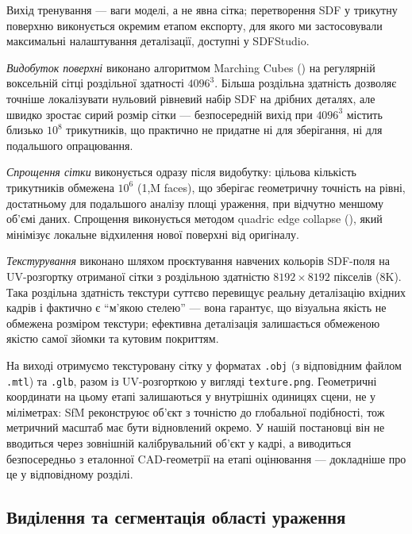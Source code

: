 \documentclass[
  ukrainian,
  10pt,
  a4paper,
  twocolumn]{article}
\begin{document}
Вихід тренування --- ваги моделі, а не явна сітка; перетворення SDF у
трикутну поверхню виконується окремим етапом експорту, для якого ми
застосовували максимальні налаштування деталізації, доступні у
SDFStudio.

\emph{Видобуток поверхні} виконано алгоритмом Marching Cubes
() на
регулярній воксельній сітці роздільної здатності \(4096^3\). Більша
роздільна здатність дозволяє точніше локалізувати нульовий рівневий
набір SDF на дрібних деталях, але швидко зростає сирий розмір сітки ---
безпосередній вихід при \(4096^3\) містить близько \(10^8\) трикутників,
що практично не придатне ні для зберігання, ні для подальшого
опрацювання.

\emph{Спрощення сітки} виконується одразу після видобутку: цільова
кількість трикутників обмежена \(10^6\) (1,M faces), що зберігає
геометричну точність на рівні, достатньому для подальшого аналізу площі
ураження, при відчутно меншому об'ємі даних. Спрощення виконується
методом quadric edge collapse
(),
який мінімізує локальне відхилення нової поверхні від оригіналу.

\emph{Текстурування} виконано шляхом проєктування навчених кольорів
SDF-поля на UV-розгортку отриманої сітки з роздільною здатністю
\(8192\times8192\) пікселів (\(8\)K). Така роздільна здатність текстури
суттєво перевищує реальну деталізацію вхідних кадрів і фактично є
``м'якою стелею'' --- вона гарантує, що візуальна якість не обмежена
розміром текстури; ефективна деталізація залишається обмеженою якістю
самої зйомки та кутовим покриттям.

На виході отримуємо текстуровану сітку у форматах \texttt{.obj} (з
відповідним файлом \texttt{.mtl}) та \texttt{.glb}, разом із
UV-розгорткою у вигляді \texttt{texture.png}. Геометричні координати на
цьому етапі залишаються у внутрішніх одиницях сцени, не у міліметрах:
SfM реконструює об'єкт з точністю до глобальної подібності, тож
метричний масштаб має бути відновлений окремо. У нашій постановці він не
вводиться через зовнішній калібрувальний об'єкт у кадрі, а виводиться
безпосередньо з еталонної CAD-геометрії на етапі оцінювання ---
докладніше про це у відповідному розділі.

\subsection{Виділення та сегментація області
ураження}\label{ux432ux438ux434ux456ux43bux435ux43dux43dux44f-ux442ux430-ux441ux435ux433ux43cux435ux43dux442ux430ux446ux456ux44f-ux43eux431ux43bux430ux441ux442ux456-ux443ux440ux430ux436ux435ux43dux43dux44f}
\end{document}
